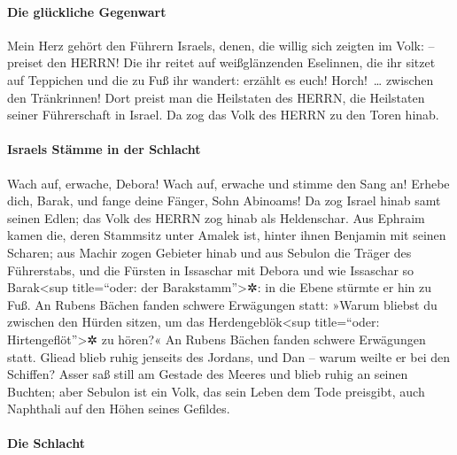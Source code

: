 \hypertarget{die-gluxfcckliche-gegenwart}{%
\paragraph{Die glückliche Gegenwart}\label{die-gluxfcckliche-gegenwart}}

Mein Herz gehört den Führern Israels, denen, die willig
sich zeigten im Volk: -- preiset den HERRN! Die ihr
reitet auf weißglänzenden Eselinnen, die ihr sitzet auf Teppichen und
die zu Fuß ihr wandert: erzählt es euch! Horch!~\ldots{}
zwischen den Tränkrinnen! Dort preist man die Heilstaten des HERRN, die
Heilstaten seiner Führerschaft in Israel. Da zog das Volk des HERRN zu
den Toren hinab.

\hypertarget{israels-stuxe4mme-in-der-schlacht}{%
\paragraph{Israels Stämme in der
Schlacht}\label{israels-stuxe4mme-in-der-schlacht}}

Wach auf, erwache, Debora! Wach auf, erwache und stimme
den Sang an! Erhebe dich, Barak, und fange deine Fänger, Sohn Abinoams!
Da zog Israel hinab samt seinen Edlen; das Volk des HERRN
zog hinab als Heldenschar. Aus Ephraim kamen die, deren
Stammsitz unter Amalek ist, hinter ihnen Benjamin mit seinen Scharen;
aus Machir zogen Gebieter hinab und aus Sebulon die Träger des
Führerstabs, und die Fürsten in Issaschar mit Debora und
wie Issaschar so Barak\textless sup title=``oder: der
Barakstamm''\textgreater✲: in die Ebene stürmte er hin zu Fuß. An Rubens
Bächen fanden schwere Erwägungen statt: »Warum bliebst du
zwischen den Hürden sitzen, um das Herdengeblök\textless sup
title=``oder: Hirtengeflöt''\textgreater✲ zu hören?« An Rubens Bächen
fanden schwere Erwägungen statt. Gliead blieb ruhig
jenseits des Jordans, und Dan -- warum weilte er bei den Schiffen? Asser
saß still am Gestade des Meeres und blieb ruhig an seinen Buchten;
aber Sebulon ist ein Volk, das sein Leben dem Tode
preisgibt, auch Naphthali auf den Höhen seines Gefildes.

\hypertarget{die-schlacht}{%
\paragraph{Die Schlacht}\label{die-schlacht}}

